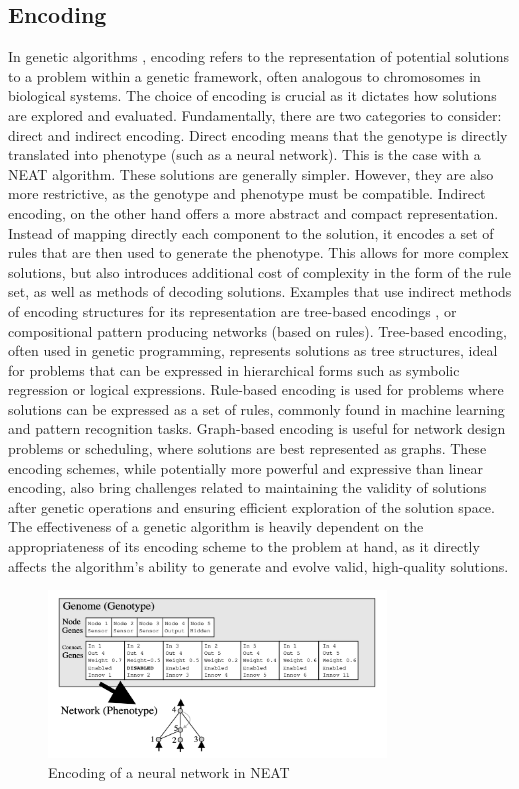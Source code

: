 \documentclass{article}
\begin{document}
\subsection{Encoding}
In genetic algorithms \cite{Mitchell_1998}, encoding refers to the representation of potential solutions to a problem within a genetic framework, often analogous to chromosomes in biological systems.
The choice of encoding is crucial as it dictates how solutions are explored and evaluated.
Fundamentally, there are two categories to consider: direct and indirect encoding.
Direct encoding means that the genotype is directly translated into phenotype (such as a neural network). This is the case with a NEAT algorithm.
These solutions are generally simpler. However, they are also more restrictive, as the genotype and phenotype must be compatible.
Indirect encoding, on the other hand offers a more abstract and compact representation. Instead of mapping directly each component to the solution,
it encodes a set of rules that are then used to generate the phenotype. This allows for more complex solutions, but also introduces additional 
cost of complexity in the form of the rule set, as well as methods of decoding solutions.
Examples that use indirect methods of encoding structures for its representation are tree-based encodings \cite{encoding}, or compositional pattern producing networks (based on rules).\cite{HyperNeat} 
Tree-based encoding, often used in genetic programming, represents solutions as tree structures, 
ideal for problems that can be expressed in hierarchical forms such as symbolic regression or logical expressions.
Rule-based encoding is used for problems where solutions can be expressed as a set of rules,
commonly found in machine learning and pattern recognition tasks. Graph-based encoding is useful for network design problems or scheduling,
where solutions are best represented as graphs. These encoding schemes, while potentially more powerful and expressive than linear encoding,
also bring challenges related to maintaining the validity of solutions after genetic operations and ensuring efficient exploration of the solution space.
The effectiveness of a genetic algorithm is heavily dependent on the appropriateness of its encoding scheme to the problem at hand, as it directly affects the algorithm's ability to generate and evolve valid, high-quality solutions.
    \begin{figure}[h]
        \centering
        \includegraphics[width=0.8\textwidth]{encoding.png}
        \caption{Encoding of a neural network in NEAT}
    \end{figure}
\end{document}
